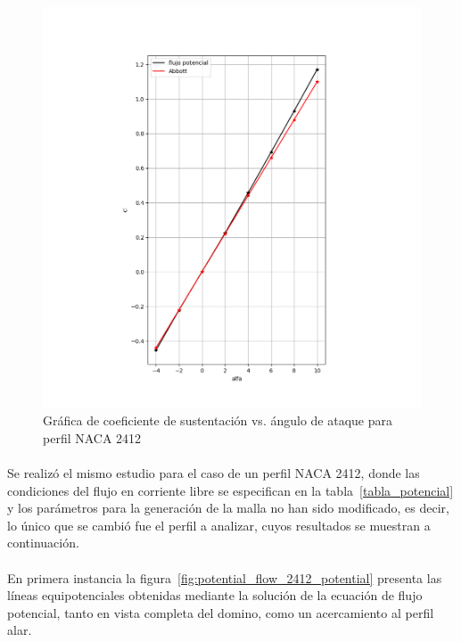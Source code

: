 \documentclass[letterpaper, openright, 12pt]{book}
\begin{document}
    \begin{figure}[H]%
        \centering
        \includegraphics[keepaspectratio,
            width=138mm]{./Imagenes/potential_flow_cl}
        \caption{Gráfica de coeficiente de sustentación vs. ángulo de ataque para
            perfil NACA 2412}
        \label{fig:potential_flow_cl}
    \end{figure}

    \paragraph*{}
    Se realizó el mismo estudio para el caso de un perfil NACA 2412, donde las
    condiciones del flujo en corriente libre se especifican en la
    tabla~\ref{tabla_potencial} y los parámetros para la generación de la malla
    no han sido modificado, es decir, lo único que se cambió fue el perfil a
    analizar, cuyos resultados se muestran a continuación.

    \paragraph*{}
    En primera instancia la figura~\ref{fig:potential_flow_2412_potential}
    presenta las líneas equipotenciales obtenidas mediante la solución de la
    ecuación de flujo potencial, tanto en vista completa del domino, como un
    acercamiento al perfil alar.
\end{document}
